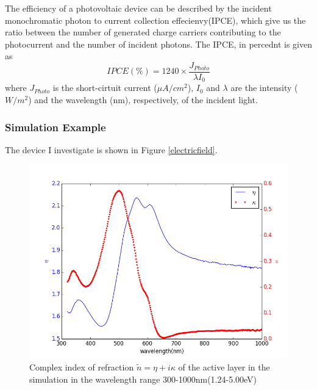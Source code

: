 \documentclass{article}
\begin{document}
The efficiency of a photovoltaic device can be described by the incident
monochromatic photon to current collection effecienvy(IPCE), which give us the
ratio between the number of generated charge carriers contributing to the
photocurrent and the number of incident photons. The IPCE, in percednt is given
as
\begin{equation}
IPCE(\%)=1240\times \frac{{{J}_{Photo}}}{\lambda {{I}_{0}}}
\end{equation}
where $J_{Photo}$ is the short-cirtuit current ($\mu A/c{{m}^{2}}$), $I_0$ and
$\lambda$ are the intensity ($W/m^2$) and the wavelength (nm), respectively, of
the incident light.

\subsubsection{Simulation Example}
The device I investigate is shown in Figure \ref{electricfield}.
\begin{figure}[h!]
  \centering
    \includegraphics[width=1\textwidth]{complexindex}
  \caption{
  Complex index of refraction $\tilde{n}=\eta +i\kappa$ of the active layer in
  the simulation in the wavelength range 300-1000nm(1.24-5.00eV) }
  \label{complexindex}
\end{figure}
\end{document}
